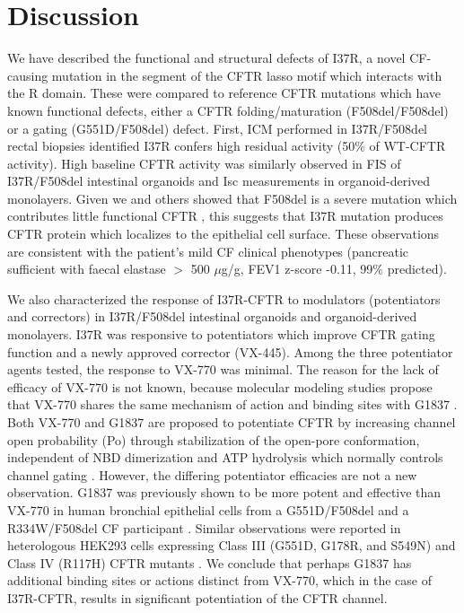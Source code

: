 \section{Discussion}

We have described the functional and structural defects of I37R, a novel CF-causing mutation in the segment of the CFTR lasso motif which interacts with the R domain. These were compared to reference CFTR mutations which have known functional defects, either a CFTR folding/maturation (F508del/F508del) or a gating (G551D/F508del) defect. First, ICM performed in I37R/F508del rectal biopsies identified I37R confers high residual activity (50\% of WT-CFTR activity). High baseline CFTR activity was similarly observed in FIS of I37R/F508del intestinal organoids and Isc measurements in organoid-derived monolayers. Given we and others showed that F508del is a severe mutation which contributes little functional CFTR \cite{vangoor2011}, this suggests that I37R mutation produces CFTR protein which localizes to the epithelial cell surface. These observations are consistent with the patient's mild CF clinical phenotypes (pancreatic sufficient with faecal elastase $>$ 500 $\mu$g/g, FEV1 z-score -0.11, 99\% predicted).

We also characterized the response of I37R-CFTR to modulators (potentiators and correctors) in I37R/F508del intestinal organoids and organoid-derived monolayers. I37R was responsive to potentiators which improve CFTR gating function and a newly approved corrector (VX-445). Among the three potentiator agents tested, the response to VX-770 was minimal. The reason for the lack of efficacy of VX-770 is not known, because molecular modeling studies propose that VX-770 shares the same mechanism of action and binding sites with G1837 \cite{liu2019, yeh2019}. Both VX-770 and G1837 are proposed to potentiate CFTR by increasing channel open probability (Po) through stabilization of the open-pore conformation, independent of NBD dimerization and ATP hydrolysis which normally controls channel gating \cite{vangoor2009, yeh2017}. However, the differing potentiator efficacies are not a new observation. G1837 was previously shown to be more potent and effective than VX-770 in human bronchial epithelial cells from a G551D/F508del and a R334W/F508del CF participant \cite{gees2018, vanderplas2018}. Similar observations were reported in heterologous HEK293 cells expressing Class III (G551D, G178R, and S549N) and Class IV (R117H) CFTR mutants \cite{gees2018, vanderplas2018}. We conclude that perhaps G1837 has additional binding sites or actions distinct from VX-770, which in the case of I37R-CFTR, results in significant potentiation of the CFTR channel.

